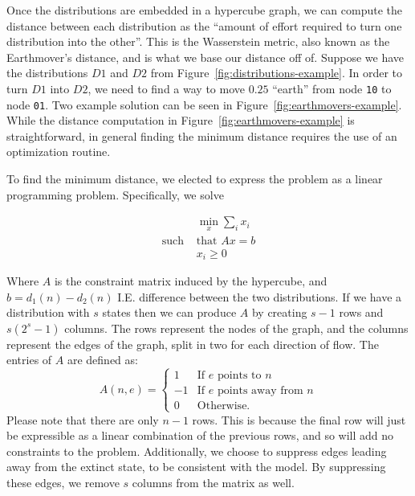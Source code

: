 \documentclass{article}
\begin{document}
Once the distributions are embedded in a hypercube graph, we can compute the distance between each distribution as the
``amount of effort required to turn one distribution into the other''. This is the Wasserstein metric, also known as the
Earthmover's distance, and is what we base our distance off of. Suppose we have the distributions $D1$ and $D2$ from
Figure~\ref{fig:distributions-example}. In order to turn $D1$ into $D2$, we need to find a way to move $0.25$ ``earth''
from node \texttt{10} to node \texttt{01}. Two example solution can be seen in Figure~\ref{fig:earthmovers-example}.
While the distance computation in Figure~\ref{fig:earthmovers-example} is straightforward, in general finding the
minimum distance requires the use of an optimization routine.

To find the minimum distance, we elected to express the problem as a linear programming problem. Specifically, we solve

\begin{align}
               & \min_x \textstyle \sum_i x_i \nonumber \\
  \text{such } & \text{that } Ax = b                    \\
               & x_i \geq 0 \nonumber
\end{align}

Where $A$ is the constraint matrix induced by the hypercube, and $b = d_1(n) - d_2(n)$ I.E. difference between the two
distributions. If we have a distribution with $s$ states then we can produce $A$ by creating $s-1$ rows and $s(2^{s}-1)$
columns. The rows represent the nodes of the graph, and the columns represent the edges of the graph, split in two for
each direction of flow. The entries of $A$ are defined as:
\begin{equation}
  A(n, e) = \begin{cases}
    1  & \text{If } e \text{ points to } n        \\
    -1 & \text{If } e \text{ points away from } n \\
    0  & \text{Otherwise.}
  \end{cases}
\end{equation}
Please note that there are only $n-1$ rows. This is because the final row will just be expressible as a linear
combination of the previous rows, and so will add no constraints to the problem. Additionally, we choose to suppress
edges leading away from the extinct state, to be consistent with the model. By suppressing these edges, we remove $s$
columns from the matrix as well.
\end{document}

